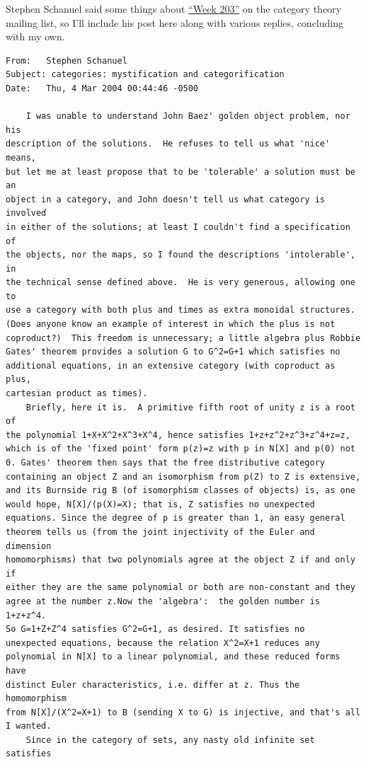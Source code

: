 \documentclass{article}
\begin{document}
Stephen Schanuel said some things about
\protect\hyperlink{week203}{``Week 203''} on the category theory mailing
list, so I'll include his post here along with various replies,
concluding with my own.

\begin{verbatim}
From:   Stephen Schanuel 
Subject: categories: mystification and categorification
Date:   Thu, 4 Mar 2004 00:44:46 -0500  

    I was unable to understand John Baez' golden object problem, nor his
description of the solutions.  He refuses to tell us what 'nice' means,
but let me at least propose that to be 'tolerable' a solution must be an
object in a category, and John doesn't tell us what category is involved
in either of the solutions; at least I couldn't find a specification of
the objects, nor the maps, so I found the descriptions 'intolerable', in
the technical sense defined above.  He is very generous, allowing one to
use a category with both plus and times as extra monoidal structures.
(Does anyone know an example of interest in which the plus is not
coproduct?)  This freedom is unnecessary; a little algebra plus Robbie
Gates' theorem provides a solution G to G^2=G+1 which satisfies no
additional equations, in an extensive category (with coproduct as plus,
cartesian product as times).
    Briefly, here it is.  A primitive fifth root of unity z is a root of
the polynomial 1+X+X^2+X^3+X^4, hence satisfies 1+z+z^2+z^3+z^4+z=z,
which is of the 'fixed point' form p(z)=z with p in N[X] and p(0) not
0. Gates' theorem then says that the free distributive category
containing an object Z and an isomorphism from p(Z) to Z is extensive,
and its Burnside rig B (of isomorphism classes of objects) is, as one
would hope, N[X]/(p(X)=X); that is, Z satisfies no unexpected
equations. Since the degree of p is greater than 1, an easy general
theorem tells us (from the joint injectivity of the Euler and dimension
homomorphisms) that two polynomials agree at the object Z if and only if
either they are the same polynomial or both are non-constant and they
agree at the number z.Now the 'algebra':  the golden number is 1+z+z^4.
So G=1+Z+Z^4 satisfies G^2=G+1, as desired. It satisfies no
unexpected equations, because the relation X^2=X+1 reduces any
polynomial in N[X] to a linear polynomial, and these reduced forms have
distinct Euler characteristics, i.e. differ at z. Thus the homomorphism
from N[X]/(X^2=X+1) to B (sending X to G) is injective, and that's all
I wanted.
    Since in the category of sets, any nasty old infinite set satisfies

\end{verbatim}
\end{document}
